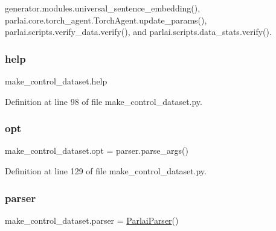 generator.\+modules.\+universal\+\_\+sentence\+\_\+embedding(), parlai.\+core.\+torch\+\_\+agent.\+Torch\+Agent.\+update\+\_\+params(), parlai.\+scripts.\+verify\+\_\+data.\+verify(), and parlai.\+scripts.\+data\+\_\+stats.\+verify().

\mbox{\label{namespacemake__control__dataset_a4d27f074058d5a41fe891d6de932ee2a}} 
\subsubsection{\texorpdfstring{help}{help}}
{\footnotesize\ttfamily make\+\_\+control\+\_\+dataset.\+help}



Definition at line 98 of file make\+\_\+control\+\_\+dataset.\+py.

\mbox{\label{namespacemake__control__dataset_a5734aed44453af52d00654a8354f3c70}} 
\subsubsection{\texorpdfstring{opt}{opt}}
{\footnotesize\ttfamily make\+\_\+control\+\_\+dataset.\+opt = parser.\+parse\+\_\+args()}



Definition at line 129 of file make\+\_\+control\+\_\+dataset.\+py.

\mbox{\label{namespacemake__control__dataset_a88e7dbb267b6ad85a78a32e5cbc6d6b3}} 
\subsubsection{\texorpdfstring{parser}{parser}}
{\footnotesize\ttfamily make\+\_\+control\+\_\+dataset.\+parser = \hyperlink{classparlai_1_1core_1_1params_1_1ParlaiParser}{Parlai\+Parser}()}



